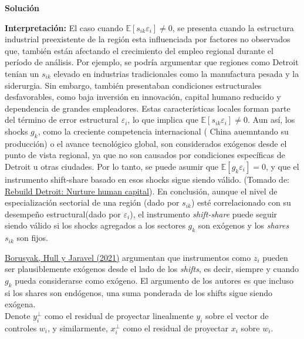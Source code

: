 \documentclass[a4paper, answers, addpoints, 11pt]{exam}
\newenvironment{solucion}{%
  \begin{mdframed}[
    backgroundcolor=blue!5,    %
    linecolor=blue!50,          %
    linewidth=2pt,              %
    leftmargin=10pt,            %
    rightmargin=8pt,           %
    topline=true,              %
    bottomline=true,            %
    roundcorner=10pt,           %
    innerleftmargin=10pt,       %
    innerrightmargin=10pt,      %
    innerbottommargin=10pt,     %
    innertopmargin=10pt         %
  ]%
  \begin{tcolorbox}[colframe=blue!50!black, colback=blue!50, coltitle=white, sharp corners=all, boxrule=1mm, width=\textwidth, halign=left, valign=center, top=0mm, bottom=0mm, left=0mm, right=0mm] \textbf{Solución} \end{tcolorbox} }{\end{mdframed}}
\begin{document}
\begin{enumerate}
\begin{itemize}
\begin{solucion}
\textbf{Interpretación:}  El caso cuando $\mathbb{E}[s_{ik}\varepsilon_i] \neq 0$, se presenta cuando la estructura industrial preexistente de la región esta influenciada por factores no observados que,  también están afectando el crecimiento del empleo regional durante el período de análisis. Por ejemplo, se podría argumentar que regiones como Detroit tenían un \( s_{ik} \) elevado en industrias tradicionales como la manufactura pesada y la siderurgia. Sin embargo, también presentaban condiciones estructurales desfavorables, como baja inversión en innovación, capital humano reducido y dependencia de grandes empleadores. Estas características locales forman parte del término de error estructural \( \varepsilon_i \), lo que implica que \( \mathbb{E}[s_{ik} \varepsilon_i] \ne 0 \). Aun así, los shocks \( g_k \), como la creciente competencia internacional ( China auemntando su producción) o el avance tecnológico global, son considerados exógenos desde el punto de vista regional, ya que no son causados por condiciones específicas de Detroit u otras ciudades. Por lo tanto, se puede asumir que \( \mathbb{E}[g_k \varepsilon_i] = 0 \), y que el instrumento shift-share basado en esos shocks sigue siendo válido.
(Tomado de: \href{https://www.detroitnews.com/story/opinion/2014/10/06/rebuild-detroit-nurture-human-capital/16824019/}{Rebuild Detroit: Nurture human capital}). 
En conclusión,  aunque el nivel de especialización sectorial de una región (dado por \( s_{ik} \)) esté correlacionado con su desempeño estructural(dado por $\varepsilon_i $), el instrumento \textit{shift-share} puede seguir siendo válido si los shocks agregados a los sectores \( g_k \) son exógenos y los \textit{shares} \( s_{ik} \) son fijos.
 
\end{solucion}

    \end{itemize}
\end{enumerate}

\href{https://academic.oup.com/restud/article-abstract/89/1/181/6294942?redirectedFrom=fulltext}{Borusyak, Hull y Jaravel (2021)} argumentan que instrumentos como $z_i$ pueden ser plausiblemente exógenos desde el lado de los \textit{shifts}, es decir, siempre y cuando $g_k$ pueda considerarse como exógeno. El argumento de los autores es que incluso si los shares son endógenos, una suma ponderada de los shifts sigue siendo exógena. \\

Denote $y^{\perp}_{i}$ como el residual de proyectar linealmente $y_i$ sobre el vector de controles $w_i$, y similarmente, $x^{\perp}_{i}$ como el residual de proyectar $x_i$ sobre $w_i$. 
\end{document}
